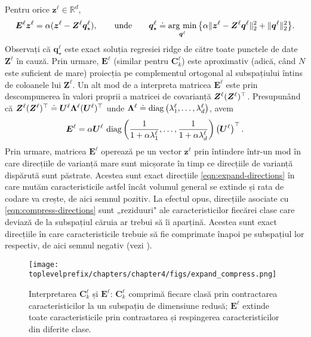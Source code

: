 \documentclass[../../book-main_ro.tex]{subfiles}
\begin{document}
\begin{remark}\label{rem:regression-interpretation} 
Pentru orice $\bm z^\ell \in \mathbb{R}^d$,
\begin{gather}
    \bm E^\ell \bm z^\ell = \alpha(\bm z^\ell - \bm Z^\ell \bm q^\ell_\star), \qquad
    \mbox{unde} \qquad \bm q^\ell_\star \doteq \operatorname*{arg\ min}_{\bm q^\ell} \big\{\alpha \|\bm z^\ell - \bm Z^\ell \bm q^\ell\|_2^2 + \|\bm q^\ell\|_2^2\big\}.
\end{gather}
Observați că $\bm q^\ell_\star$ este exact soluția regresiei ridge de către toate punctele de date $\bm Z^\ell$ în cauză. Prin urmare, $\bm E^\ell$ (similar pentru $\bm C^\ell_k$) este aproximativ (adică, când $N$ este suficient de mare) proiecția pe complementul ortogonal al subspațiului întins de coloanele lui $\bm Z^\ell$. Un alt mod de a interpreta matricea $\bm E^\ell$ este prin descompunerea în valori proprii a matricei de covarianță $\bm{Z}^\ell (\bm{Z}^\ell)^\top$. Presupunând că $\bm{Z}^\ell (\bm{Z}^\ell)^\top \doteq \bm U^\ell \bm \Lambda^\ell (\bm U^\ell)^\top$ unde $\bm \Lambda^\ell \doteq \operatorname{diag}\left(\lambda^\ell_1, \ldots, \lambda^\ell_d \right)$, avem 
\begin{equation}
\bm E^\ell = \alpha \bm U^\ell\, \operatorname{diag}\left(\frac{1}{1+\alpha\lambda^\ell_1}, \ldots, \frac{1}{1+\alpha\lambda^\ell_d}\right) \left(\bm U^\ell\right)^\top.
\end{equation}
Prin urmare, matricea $\bm E^\ell$ operează pe un vector $\bm z^\ell$ prin întindere într-un mod în care direcțiile de varianță mare sunt micșorate în timp ce direcțiile de varianță dispărută sunt păstrate. Acestea sunt exact direcțiile \eqref{eqn:expand-directions} în care mutăm caracteristicile astfel încât volumul general se extinde și rata de codare va crește, de aici semnul pozitiv. La efectul opus, direcțiile asociate cu \eqref{eqn:compress-directions} sunt „reziduuri" ale caracteristicilor fiecărei clase care deviază de la subspațiul căruia ar trebui să îi aparțină. Acestea sunt exact direcțiile în care caracteristicile trebuie să fie comprimate înapoi pe subspațiul lor respectiv, de aici semnul negativ (vezi ). 

\begin{figure}[t]
    \centering
    \texttt{[image: \\toplevelprefix/chapters/chapter4/figs/expand\_compress.png]}
    \caption{\small Interpretarea $\bm C^\ell_k$ și $\bm E^\ell$: $\bm C^\ell_k$ comprimă fiecare clasă prin contractarea caracteristicilor la un subspațiu de dimensiune redusă; $\bm E^\ell$ extinde toate caracteristicile prin contrastarea și respingerea caracteristicilor din diferite clase.}
    \label{fig:regression-interpretation}
    \vspace{-0.1in}
\end{figure}



\end{remark}
\end{document}
